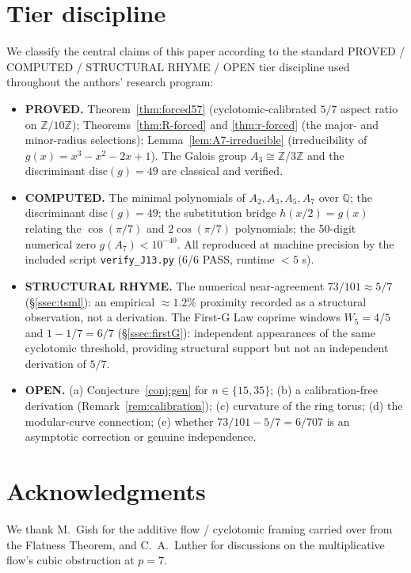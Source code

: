 \documentclass[11pt,reqno]{amsart}
\theoremstyle{plain}
\theoremstyle{definition}
\newcommand{\Z}{\mathbb{Z}}
\newcommand{\Q}{\mathbb{Q}}
\newcommand{\disc}{\mathrm{disc}}
\begin{document}
\section*{Tier discipline}

We classify the central claims of this paper according to the standard PROVED / COMPUTED / STRUCTURAL RHYME / OPEN tier discipline used throughout the authors' research program:

\begin{itemize}
\item \textbf{PROVED.} Theorem~\ref{thm:forced57} (cyclotomic-calibrated $5/7$ aspect ratio on $\Z/10\Z$); Theorems~\ref{thm:R-forced} and \ref{thm:r-forced} (the major- and minor-radius selections); Lemma~\ref{lem:A7-irreducible} (irreducibility of $g(x) = x^{3} - x^{2} - 2x + 1$). The Galois group $A_{3} \cong \Z/3\Z$ and the discriminant $\disc(g) = 49$ are classical and verified.
\item \textbf{COMPUTED.} The minimal polynomials of $A_{2}, A_{3}, A_{5}, A_{7}$ over $\Q$; the discriminant $\disc(g) = 49$; the substitution bridge $h(x/2) = g(x)$ relating the $\cos(\pi/7)$ and $2\cos(\pi/7)$ polynomials; the 50-digit numerical zero $g(A_{7}) < 10^{-40}$. All reproduced at machine precision by the included script \texttt{verify\_J13.py} (6/6 PASS, runtime $< 5$ s).
\item \textbf{STRUCTURAL RHYME.} The numerical near-agreement $73 / 101 \approx 5/7$ (\S\ref{ssec:tsml}): an empirical $\approx 1.2\%$ proximity recorded as a structural observation, not a derivation. The First-G Law coprime windows $W_{5} = 4/5$ and $1 - 1/7 = 6/7$ (\S\ref{ssec:firstG}): independent appearances of the same cyclotomic threshold, providing structural support but not an independent derivation of $5/7$.
\item \textbf{OPEN.} (a) Conjecture~\ref{conj:gen} for $n \in \{15, 35\}$; (b) a calibration-free derivation (Remark~\ref{rem:calibration}); (c) curvature of the ring torus; (d) the modular-curve connection; (e) whether $73/101 - 5/7 = 6/707$ is an asymptotic correction or genuine independence.
\end{itemize}

\section*{Acknowledgments}

We thank M.~Gish for the additive flow / cyclotomic framing carried over from the Flatness Theorem, and C.~A.~Luther for discussions on the multiplicative flow's cubic obstruction at $p = 7$.
\end{document}
